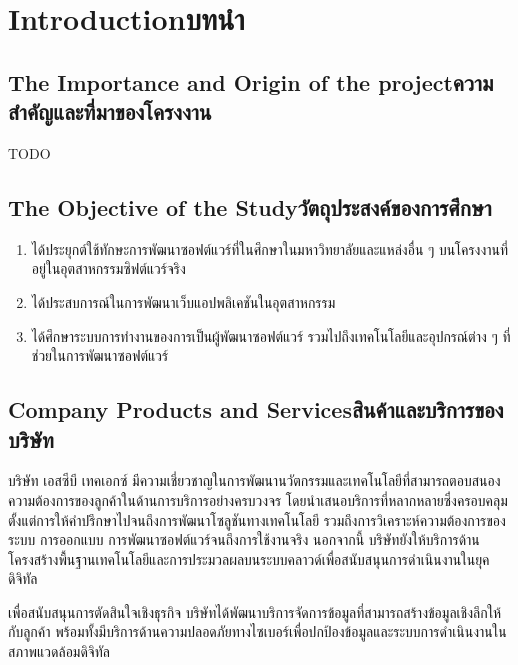 \chapter{\ifenglish Introduction\else บทนำ\fi}

\section{\ifenglish The Importance and Origin of the 
project\else ความสำคัญและที่มาของโครงงาน\fi}
TODO

\section{\ifenglish The Objective of the Study\else วัตถุประสงค์ของการศึกษา\fi}
\begin{enumerate}
    \item ได้ประยุกต์ใช้ทักษะการพัฒนาซอฟต์แวร์ที่ในศึกษาในมหาวิทยาลัยและแหล่งอื่น ๆ บนโครงงานที่อยู่ในอุตสาหกรรมซิฟต์แวร์จริง
    \item ได้ประสบการณ์ในการพัฒนาเว็บแอปพลิเคชันในอุตสาหกรรม
    \item ได้ศึกษาระบบการทำงานของการเป็นผู้พัฒนาซอฟต์แวร์ รวมไปถึงเทคโนโลยีและอุปกรณ์ต่าง ๆ ที่ช่วยในการพัฒนาซอฟต์แวร์
\end{enumerate}

\section{\ifenglish Company Products and Services\else สินค้าและบริการของบริษัท \fi}
บริษัท เอสซีบี เทคเอกซ์ มีความเชี่ยวชาญในการพัฒนานวัตกรรมและเทคโนโลยีที่สามารถตอบสนองความต้องการของลูกค้าในด้านการบริการอย่างครบวงจร โดยนำเสนอบริการที่หลากหลายซึ่งครอบคลุมตั้งแต่การให้คำปรึกษาไปจนถึงการพัฒนาโซลูชันทางเทคโนโลยี รวมถึงการวิเคราะห์ความต้องการของระบบ การออกแบบ การพัฒนาซอฟต์แวร์จนถึงการใช้งานจริง นอกจากนี้ บริษัทยังให้บริการด้านโครงสร้างพื้นฐานเทคโนโลยีและการประมวลผลบนระบบคลาวด์เพื่อสนับสนุนการดำเนินงานในยุคดิจิทัล

เพื่อสนับสนุนการตัดสินใจเชิงธุรกิจ บริษัทได้พัฒนาบริการจัดการข้อมูลที่สามารถสร้างข้อมูลเชิงลึกให้กับลูกค้า พร้อมทั้งมีบริการด้านความปลอดภัยทางไซเบอร์เพื่อปกป้องข้อมูลและระบบการดำเนินงานในสภาพแวดล้อมดิจิทัล


